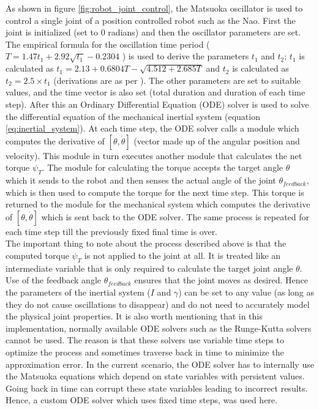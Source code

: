 \documentclass[12pt,twoside]{article}
\theoremstyle{plain}
\theoremstyle{definition}
\theoremstyle{remark}
\newcommand{\forceindent}{\leavevmode{\parindent=2em\indent}}
\begin{document}
\forceindent As shown in figure \ref{fig:robot_joint_control}, the Matsuoka oscillator is used to control a single joint of a position controlled robot such as the Nao. First the joint is initialized (set to 0 radians) and then the oscillator parameters are set. The empirical formula for the oscillation time period ($T=1.47t_1 + 2.92\sqrt{t_1} - 0.2304$ \cite{Ronsse2009}) is used to derive the parameters $t_1$ and $t_2$; $t_1$ is calculated as $t_1=2.13 + 0.6804T - \sqrt{4.512 + 2.685T}$ and $t_2$ is calculated as $t_2=2.5 \times t_1$ (derivations are as per \cite{Ronsse2009}). The other parameters are set to suitable values, and the time vector is also set (total duration and duration of each time step). After this an Ordinary Differential Equation (ODE) solver is used to solve the differential equation of the mechanical inertial system (equation \ref{eq:inertial_system}). At each time step, the ODE solver calls a module which computes the derivative of $[\theta, \dot{\theta}]$ (vector made up of the angular position and velocity). This module in turn executes another module that calculates the net torque $\psi_T$. The module for calculating the torque accepts the target angle $\theta$ which it sends to the robot and then senses the actual angle of the joint $\theta_{feedback}$, which is then used to compute the torque for the next time step. This torque is returned to the module for the mechanical system which computes the derivative of $[\theta, \dot{\theta}]$ which is sent back to the ODE solver. The same process is repeated for each time step till the previously fixed final time is over.\\
\forceindent The important thing to note about the process described above is that the computed torque $\psi_T$ is not applied to the joint at all. It is treated like an intermediate variable that is only required to calculate the target joint angle $\theta$. Use of the feedback angle $\theta_{feedback}$ ensures that the joint moves as desired. Hence the parameters of the inertial system ($I$ and $\gamma$) can be set to any value (as long as they do not cause oscillations to disappear) and do not need to accurately model the physical joint properties. It is also worth mentioning that in this implementation, normally available ODE solvers such as the Runge-Kutta solvers cannot be used. The reason is that these solvers use variable time steps to optimize the process and sometimes traverse back in time to minimize the approximation error. In the current scenario, the ODE solver has to internally use the Matsuoka equations which depend on state variables with persistent values. Going back in time can corrupt these state variables leading to incorrect results. Hence, a custom ODE solver which uses fixed time steps, was used here.\\
\end{document}
